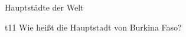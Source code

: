 \begin{aufgabe}{Hauptstädte der Welt}
   \begin{teilaufgabe}[o]{t}{1}{1}
      Wie heißt die Hauptstadt von Burkina Faso?
   \end{teilaufgabe}
   \begin{loesung}
   \end{loesung}
\end{aufgabe}
